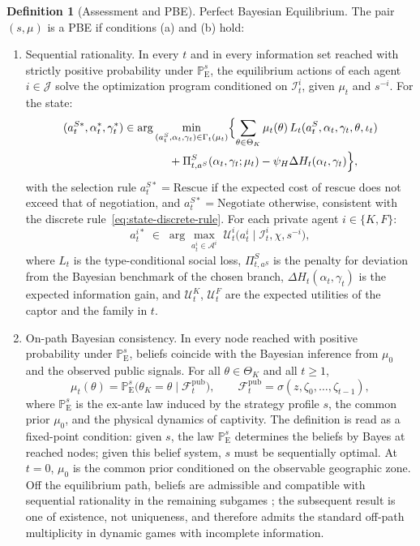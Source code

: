 \documentclass[review,authoryear,12pt]{elsarticle}
\providecommand{\textcite}{\citet}
\theoremstyle{plain}
\theoremstyle{definition}
\newtheorem{definition}[theorem]{Definition}
\newcommand{\ProbE}{\mathbb{P}_{\mathrm{E}}}
\newcommand{\ThetaK}{\Theta_K}
\newcommand{\1}{\mathbf{1}}
\begin{document}
\begin{definition}[Assessment and PBE]
\smallskip
\noindent Perfect Bayesian Equilibrium. The pair $(s,\mu)$ is a PBE if conditions \textup{(a)} and \textup{(b)} hold:
\begin{enumerate}
  \item[\textup{(a)}] Sequential rationality. In every $t$ and in every information set reached with strictly positive probability under $\ProbE^s$, the equilibrium actions of each agent $i\in\mathcal{J}$ solve the optimization program conditioned on $\mathcal{I}_t^i$, given $\mu_t$ and $s^{-i}$. For the state:
  \[
  \begin{aligned}
  (a_t^{S\ast},\alpha_t^\ast,\gamma_t^\ast)
  &\in
  \arg\min_{(a_t^S,\alpha_t,\gamma_t)\in\Gamma_t(\mu_t)}
  \Bigl\{
  \sum_{\theta\in\ThetaK}\mu_t(\theta)\,L_t(a_t^S,\alpha_t,\gamma_t,\theta,\iota_t)\\
  &\qquad\qquad
  +\Pi_{t,a^S}^S(\alpha_t,\gamma_t;\mu_t)-\psi_H\Delta H_t(\alpha_t,\gamma_t)
  \Bigr\},
  \end{aligned}
  \]
  with the selection rule $a_t^{S\ast}=\text{Rescue}$ if the expected cost of rescue does not exceed that of negotiation, and $a_t^{S\ast}=\text{Negotiate}$ otherwise, consistent with the discrete rule~\eqref{eq:state-discrete-rule}. For each private agent $i\in\{K,F\}$:
  \[
  a_t^{i\ast}\;\in\;
  \arg\max_{a_t^i\in\mathcal{A}^i}
  \;\mathcal{U}^i_t\!\bigl(a_t^i\mid \mathcal{I}_t^i,\chi,s^{-i}\bigr),
  \]
  where $L_t$ is the type-conditional social loss, $\Pi_{t,a^S}^S$ is the penalty for deviation from the Bayesian benchmark of the chosen branch, $\Delta H_t(\alpha_t,\gamma_t)$ is the expected information gain, and $\mathcal{U}^K_t$, $\mathcal{U}^F_t$ are the expected utilities of the captor and the family in $t$.

  \item[\textup{(b)}] On-path Bayesian consistency. In every node reached with positive probability under $\ProbE^s$, beliefs coincide with the Bayesian inference from $\mu_0$ and the observed public signals. For all $\theta\in\ThetaK$ and all $t\ge 1$,
  \begin{equation}
  \label{eq:def712-bayes-mu}
  \mu_t(\theta)=\ProbE^s\!\bigl(\theta_K=\theta\mid \mathcal{F}_t^{\mathrm{pub}}\bigr),
  \qquad
  \mathcal{F}_t^{\mathrm{pub}}=\sigma(z,\zeta_0,\ldots,\zeta_{t-1}),
  \end{equation}
  where $\ProbE^s$ is the ex-ante law induced by the strategy profile $s$, the common prior $\mu_0$, and the physical dynamics of captivity. The definition is read as a fixed-point condition: given $s$, the law $\ProbE^s$ determines the beliefs by Bayes at reached nodes; given this belief system, $s$ must be sequentially optimal. At $t=0$, $\mu_0$ is the common prior conditioned on the observable geographic zone. Off the equilibrium path, beliefs are admissible and compatible with sequential rationality in the remaining subgames \textcite{FudenbergTirole1991,KrepsWilson1982}; the subsequent result is one of existence, not uniqueness, and therefore admits the standard off-path multiplicity in dynamic games with incomplete information.
\end{enumerate}
\end{definition}
\end{document}
